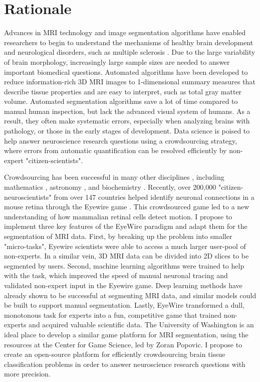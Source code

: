 \section*{Rationale}

Advances in MRI technology and image segmentation algorithms have enabled researchers to begin to understand the mechanisms of healthy brain development \cite{giedd1999brain} and neurological disorders, such as multiple sclerosis \cite{bakshi2008mri}. Due to the large variability of brain morphology, increasingly large sample sizes are needed to answer important biomedical questions. Automated algorithms have been developed to reduce information-rich 3D MRI images to 1-dimensional summary measures that describe tissue properties and are easy to interpret, such as total gray matter volume. Automated  segmentation algorithms save a lot of time compared to manual human inspection, but lack the advanced visual system of humans. As a result, they often make systematic errors, especially when analyzing brains with pathology, or those in the early stages of development. Data science is poised to help answer neuroscience research questions using a crowdsourcing strategy, where errors from automatic quantification can be resolved efficiently by non-expert "citizen-scientists".

Crowdsourcing has been successful in many other disciplines \cite{wiggins2011conservation}, including mathematics \cite{cranshaw2011polymath}, astronomy \cite{lintott2008galaxy}, and biochemistry \cite{eiben2012increased} . Recently, over 200,000 "citizen-neuroscientists"  from over 147 countries helped identify neuronal connections in a mouse retina through the Eyewire game \cite{kim2014space}. This crowdsourced game led to a new understanding of how mammalian retinal cells detect motion. I propose to implement three key features of the EyeWire paradigm and adapt them for the segmentation of MRI data. First, by breaking up the problem into smaller "micro-tasks", Eyewire scientists were able to access a much larger user-pool of non-experts. In a similar vein, 3D MRI data can be divided into 2D slices to be segmented by users. Second, machine learning algorithms were trained to help with the task, which improved the speed of manual neuronal tracing and validated non-expert input in the Eyewire game. Deep learning methods have already shown to be successful at segmenting MRI data, and similar models could be built to support manual segmentation. Lastly, EyeWire transformed a dull, monotonous task for experts into a fun, competitive game that trained non-experts and acquired valuable scientific data. The University of Washington is an ideal place to develop a similar game platform for MRI segmentation, using the resources at the Center for Game Science, led by Zoran Popovic. I propose to create an open-source platform for efficiently crowdsourcing brain tissue classification problems in order to answer neuroscience research questions with more precision.

